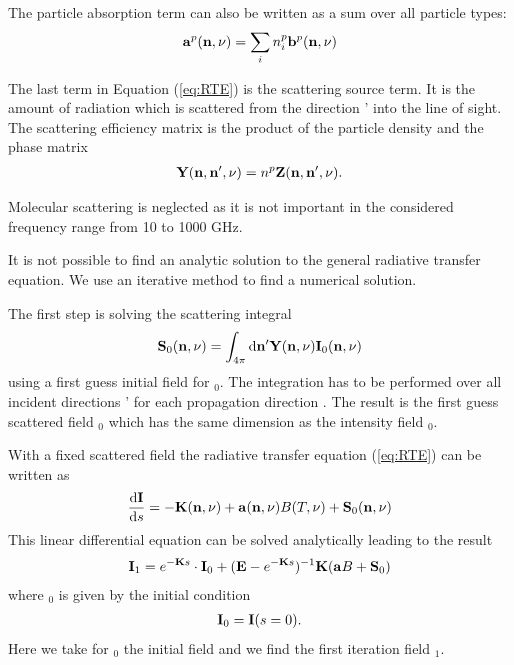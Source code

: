 The particle absorption term can also be written as a sum over all
particle types:
\begin{eqnarray}
  {\bf a}^{p}({\bf n}, \nu) = \sum_i n^p_i {\bf b}^{p} ({\bf n}, \nu)
\end{eqnarray}

The last term in Equation (\ref{eq:RTE}) is the scattering source
term. It is the 
amount of radiation which is scattered from the direction \PDir'   
into the line of sight.  The scattering efficiency matrix
\SEfMat is the 
product of the particle density \PDen  and the phase matrix \PhaMat
\begin{eqnarray}
{\bf Y}({\bf n}, {\bf n}', \nu) = n^p{\bf Z}({\bf n}, {\bf n}', \nu).
\end{eqnarray}

Molecular scattering is neglected as it is not important in the 
considered frequency range from 10 to 1000 GHz. 


\label{sec:scattering:solution_rte}

It is not possible to find an analytic solution to the general
radiative transfer equation. We use an iterative method to find a
numerical solution.

\label{sec:scattering:scat_int}

The first step is solving the scattering integral
\begin{eqnarray}
  {\bf S}_0 ({\bf n}, \nu)  = \int_{4\pi} \mathrm{d} {\bf n}' {\bf Y}({\bf n}, \nu) {\bf I}_0({\bf n}, \nu) 
\end{eqnarray}
using a first guess initial field for \StoVec$_0$\DirFre. The integration
has to be performed over all incident directions \PDir' for each
propagation direction \PDir. The result is the first guess scattered field \ScaInt$_0$\DirFre
which has the same dimension as the intensity field \StoVec$_0$\DirFre. 

\label{sec:scattering:RTE}
With a fixed scattered field \ScaInt\DirFre the radiative transfer
equation (\ref{eq:RTE}) can be written as
\begin{eqnarray}
     \frac{\mathrm{d} {\bf I}}{\mathrm{d} s} =
     -{\bf K}({\bf n}, \nu)+{\bf a}({\bf n}, \nu) B(T, \nu)
     +{\bf S}_0({\bf n}, \nu)
\end{eqnarray} 
This linear differential equation can be solved analytically leading
to the result
\begin{eqnarray}
  \label{eq:scattering:RTE_sol}
  {\bf I}_1 = e^{-{\bf K} s}\cdot{\bf I}_0 + ({\bf E} - e^{-{\bf K}
    s})^{-1}{{\bf K}} ({\bf a} B + {\bf S}_0)
\end{eqnarray}
where \StoVec$_0$ is given by the initial condition
\begin{eqnarray}
  {\bf I}_0 =  {\bf I}(s = 0).
\end{eqnarray}
Here we take for \StoVec$_0$ the initial field and we find the first
iteration field \StoVec$_1$.

